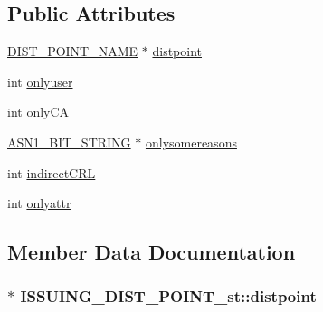 \subsection*{Public Attributes}
\begin{DoxyCompactItemize}
\item 
\hyperlink{x509v3_8h_a1e98b413217a18a88255e02b31263c93}{D\+I\+S\+T\+\_\+\+P\+O\+I\+N\+T\+\_\+\+N\+A\+ME} $\ast$ \hyperlink{struct_i_s_s_u_i_n_g___d_i_s_t___p_o_i_n_t__st_aef98ad516a93a8eebe0f38f97515e434}{distpoint}
\item 
int \hyperlink{struct_i_s_s_u_i_n_g___d_i_s_t___p_o_i_n_t__st_ad0d25508c76cac7e0d7f4bb0ac1d64d3}{onlyuser}
\item 
int \hyperlink{struct_i_s_s_u_i_n_g___d_i_s_t___p_o_i_n_t__st_a12e9fbf6b321e3b7736e78ae24f89d72}{only\+CA}
\item 
\hyperlink{ossl__typ_8h_af837aaa00e151b1e8773aea5a8fe1cc4}{A\+S\+N1\+\_\+\+B\+I\+T\+\_\+\+S\+T\+R\+I\+NG} $\ast$ \hyperlink{struct_i_s_s_u_i_n_g___d_i_s_t___p_o_i_n_t__st_a87b14dba5e51a2c4cdae476453725cec}{onlysomereasons}
\item 
int \hyperlink{struct_i_s_s_u_i_n_g___d_i_s_t___p_o_i_n_t__st_a9872380cab3fa8a4d58ae149ca7bac16}{indirect\+C\+RL}
\item 
int \hyperlink{struct_i_s_s_u_i_n_g___d_i_s_t___p_o_i_n_t__st_abbf8e7d0171fafc31d395b1804490ba5}{onlyattr}
\end{DoxyCompactItemize}


\subsection{Member Data Documentation}
\subsubsection[{\texorpdfstring{distpoint}{distpoint}}]{$\ast$ I\+S\+S\+U\+I\+N\+G\+\_\+\+D\+I\+S\+T\+\_\+\+P\+O\+I\+N\+T\+\_\+st\+::distpoint}\hypertarget{struct_i_s_s_u_i_n_g___d_i_s_t___p_o_i_n_t__st_aef98ad516a93a8eebe0f38f97515e434}{}\label{struct_i_s_s_u_i_n_g___d_i_s_t___p_o_i_n_t__st_aef98ad516a93a8eebe0f38f97515e434}
